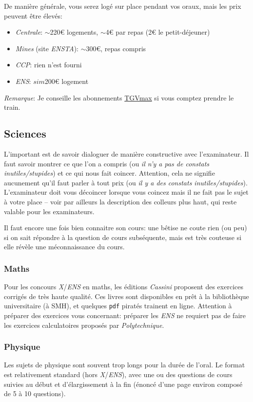 \documentclass{article}
\begin{document}
De manière générale, vous serez logé sur place pendant vos oraux, mais les prix peuvent être élevés:


\begin{itemize}
\item  \textit{Centrale}: $\sim$220€ logements, $\sim$4€ par repas (2€ le petit-déjeuner)
\item  \textit{Mines} (site \textit{ENSTA}): $\sim$300€, repas compris
\item  \textit{CCP}: rien n'est fourni
\item  \textit{ENS}: $sim$200€ logement

\end{itemize}

\textit{Remarque}: Je conseille les abonnements \href{https://www.oui.sncf/bons-plans/tgvmax}{TGVmax} si vous comptez prendre le train.

\subsection{Sciences}
L'important est de savoir dialoguer de manière constructive avec l'examinateur.
Il faut savoir montrer ce que l'on a compris (ou \textit{il n'y a pas de constats inutiles/stupides}) et ce qui nous fait coincer.
Attention, cela ne signifie aucunement qu'il faut parler à tout prix (ou \textit{il y a des constats inutiles/stupides}).
L'examinateur doit vous décoincer lorsque vous coincez mais il ne fait pas le sujet à votre place -- voir par ailleurs la description des colleurs plus haut, qui reste valable pour les examinateurs.

Il faut encore une fois bien connaitre son cours: une bêtise ne coute rien (ou peu) si on sait répondre à la question de cours subséquente, mais est très couteuse si elle révèle une méconnaissance du cours.

\subsubsection{Maths}
Pour les concours \textit{X}/\textit{ENS} en maths, les éditions \textit{Cassini} proposent des exercices corrigés de très haute qualité.
Ces livres sont disponibles en prêt à la bibliothèque universitaire (à SMH), et quelques \texttt{pdf} piratés trainent en ligne.
Attention à préparer des exercices vous concernant: préparer les \textit{ENS} ne requiert pas de faire les exercices calculatoires proposés par \textit{Polytechnique}.

\subsubsection{Physique}
Les sujets de physique sont souvent trop longs pour la durée de l'oral.
Le format est relativement standard (hors \textit{X}/\textit{ENS}), avec une ou des questions de cours suivies au début et d'élargissement à la fin (énoncé d'une page environ composé de 5 à 10 questions).
\end{document}
